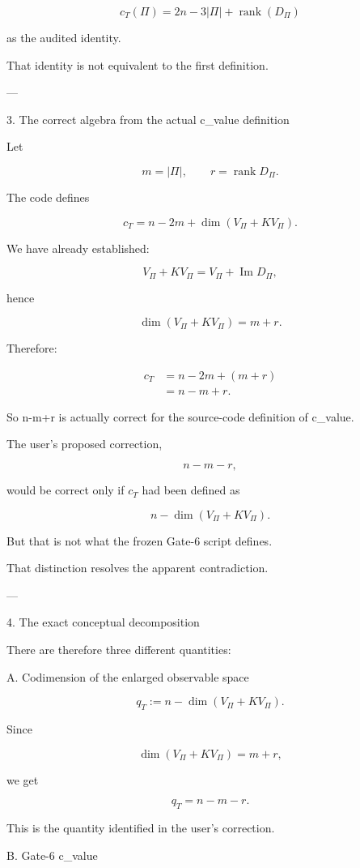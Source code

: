 \[
c_T(\Pi)=2n-3|\Pi|+\operatorname{rank}(D_\Pi)
\]

as the audited identity. 

That identity is not equivalent to the first definition.


---

3. The correct algebra from the actual c_value definition

Let

\[
m=|\Pi|,
\qquad
r=\operatorname{rank}D_\Pi.
\]

The code defines

\[
c_T
=
n-2m+\dim(V_\Pi+KV_\Pi).
\]

We have already established:

\[
V_\Pi+KV_\Pi
=
V_\Pi+\operatorname{Im}D_\Pi,
\]

hence

\[
\dim(V_\Pi+KV_\Pi)
=
m+r.
\]

Therefore:

\[
\begin{aligned}
c_T
&=n-2m+(m+r)\\
&=\boxed{n-m+r}.
\end{aligned}
\]

So n-m+r is actually correct for the source-code definition of c_value.

The user's proposed correction,

\[
n-m-r,
\]

would be correct only if \(c_T\) had been defined as

\[
n-\dim(V_\Pi+KV_\Pi).
\]

But that is not what the frozen Gate-6 script defines.

That distinction resolves the apparent contradiction.


---

4. The exact conceptual decomposition

There are therefore three different quantities:

A. Codimension of the enlarged observable space

\[
q_T
:=
n-\dim(V_\Pi+KV_\Pi).
\]

Since

\[
\dim(V_\Pi+KV_\Pi)=m+r,
\]

we get

\[
\boxed{
q_T=n-m-r.
}
\]

This is the quantity identified in the user's correction.

B. Gate-6 c_value

